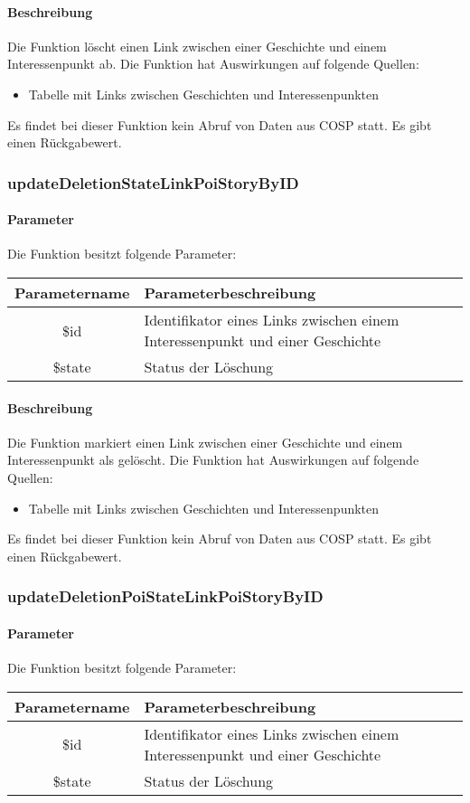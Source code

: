 \paragraph{Beschreibung} Die Funktion löscht einen Link zwischen einer Geschichte und einem Interessenpunkt ab. Die Funktion hat Auswirkungen auf folgende Quellen:
\begin{itemize}
	\item Tabelle mit Links zwischen Geschichten und Interessenpunkten
\end{itemize}
Es findet bei dieser Funktion kein Abruf von Daten aus {\glqq COSP\grqq} statt. Es gibt einen Rückgabewert.
\subsubsection{updateDeletionStateLinkPoiStoryByID}
\paragraph{Parameter} Die Funktion besitzt folgende Parameter:
\begin{table}[H]
	\begin{tabular}{|c|p{11cm}|}
		\hline
		\textbf{Parametername} & \textbf{Parameterbeschreibung} \\ \hline
		\$id    & Identifikator eines Links zwischen einem Interessenpunkt und einer Geschichte \\ \hline
		\$state & Status der Löschung \\ \hline
	\end{tabular}
\end{table}
\paragraph{Beschreibung} Die Funktion markiert einen Link zwischen einer Geschichte und einem Interessenpunkt als gelöscht. Die Funktion hat Auswirkungen auf folgende Quellen:
\begin{itemize}
	\item Tabelle mit Links zwischen Geschichten und Interessenpunkten
\end{itemize}
Es findet bei dieser Funktion kein Abruf von Daten aus {\glqq COSP\grqq} statt. Es gibt einen Rückgabewert.
\subsubsection{updateDeletionPoiStateLinkPoiStoryByID}
\paragraph{Parameter} Die Funktion besitzt folgende Parameter:
\begin{table}[H]
	\begin{tabular}{|c|p{11cm}|}
		\hline
		\textbf{Parametername} & \textbf{Parameterbeschreibung} \\ \hline
		\$id    & Identifikator eines Links zwischen einem Interessenpunkt und einer Geschichte \\ \hline
		\$state & Status der Löschung \\ \hline
	\end{tabular}
\end{table}
